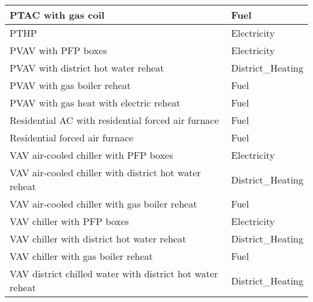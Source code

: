 \begin{table}[hb!]
\begin{tabular}{|l|l|}
PTAC with gas coil                                                  & Fuel                             \\ \hline
PTHP                                                                & Electricity                      \\ \hline
PVAV with PFP boxes                                                 & Electricity                      \\ \hline
PVAV with district hot water reheat                                 & District\_Heating                \\ \hline
PVAV with gas boiler reheat                                         & Fuel                             \\ \hline
PVAV with gas heat with electric reheat                             & Fuel                             \\ \hline
Residential AC with residential forced   air furnace                & Fuel                             \\ \hline
Residential forced air furnace                                      & Fuel                             \\ \hline
VAV air-cooled chiller with PFP boxes                               & Electricity                      \\ \hline
VAV air-cooled chiller with district hot   water reheat             & District\_Heating                \\ \hline
VAV air-cooled chiller with gas boiler   reheat                     & Fuel                             \\ \hline
VAV chiller with PFP boxes                                          & Electricity                      \\ \hline
VAV chiller with district hot water   reheat                        & District\_Heating                \\ \hline
VAV chiller with gas boiler reheat                                  & Fuel                             \\ \hline
VAV district chilled water with district   hot water reheat         & District\_Heating                \\ \hline
\end{tabular}
\end{table}